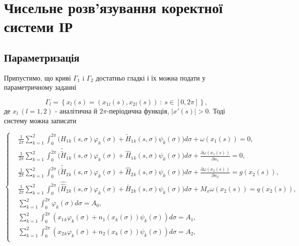 \documentclass[12pt]{report}
\begin{document}
\chapter{Чисельне розв'язування коректної системи ІР}

\section{Параметризація}


Припустимо, що криві $\Gamma_1$ i $\Gamma_2$ достатньо гладкі і їх можна подати у параметричному заданні 
 
 \begin{equation}
 	\Gamma_l=\left\{x_l(s)=(x_1{_l}(s),x_2{_l}(s)) \ : \ s\in [0,2\pi]\right\},
  \end{equation}
 де $x_l \ (l=1,2)$ - аналітична й $2\pi$-періодична функція, $|x'(s)|>0.$
 Тоді систему можна записати 
 
 \begin{equation}
 		\left\{
	 	\begin{split}
		\label{paramSystem}
	 		&\frac{1}{2\pi}\sum_{k=1}^{2}\int_{0}^{2\pi}\bigg(H_1{_k}(s, \sigma)\varphi_k(\sigma)+\tilde{H}_1{_k}(s, \sigma)\psi_k(\sigma)\bigg)d\sigma+\omega(x_1(s))=0,\\
			&\frac{1}{2\pi}\sum_{k=1}^{2}\int_{0}^{2\pi}\bigg(\tilde{\tilde{H}}_1{_k}(s, \sigma)\varphi_k(\sigma)+\hat{H}_1{_k}(s, \sigma)\psi_k(\sigma)\bigg)d\sigma+\frac{\partial\omega(x_1(s))}{\partial n_1}=0, \\
			&\frac{1}{2\pi}\sum_{k=1}^{2}\int_{0}^{2\pi}\bigg(\tilde{\tilde{H}}_2{_k}(s, \sigma)\varphi_k(\sigma)+\hat{H}_2{_k}(s, \sigma)\psi_k(\sigma)\bigg)d\sigma+\frac{\partial\omega(x_2(s))}{\partial n_2}=g(x_2(s)), \\
			&\frac{1}{2\pi}\sum_{k=1}^{2}\int_{0}^{2\pi}\bigg(\hat{\hat{H}}_2{_k}(s, \sigma)\varphi_k(\sigma)+\bar{H}_2{_k}(s, \sigma)\psi_k(\sigma)\bigg)d\sigma+M_x\omega(x_2(s))=q(x_2(s)),\\
			&\sum_{k=1}^{2}\int_{0}^{2\pi}\varphi_k(\sigma)d\sigma=A_0, \\
			&\sum_{k=1}^{2}\int_{0}^{2\pi}(x_1{_k}\varphi_k(\sigma)+n_1(x_k(\sigma))\psi_k(\sigma))d\sigma=A_1, \\
			&\sum_{k=1}^{2}\int_{0}^{2\pi}(x_2{_k}\varphi_k(\sigma)+n_2(x_k(\sigma))\psi_k(\sigma))d\sigma=A_2, \\
		\end{split}
		\right.
\end{equation}
\end{document}
